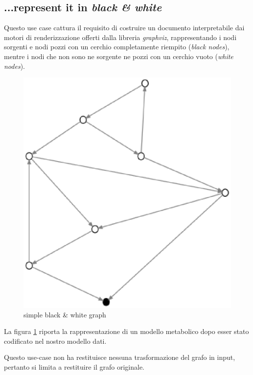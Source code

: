 \subsection{...represent it in \emph{black \& white}}
\label{subsection:represent-it-in-black-and-white}
Questo use case cattura il requisito di costruire un documento
interpretabile dai motori di renderizzazione offerti dalla libreria
\emph{graphviz}, rappresentando i nodi sorgenti e nodi pozzi con un
cerchio completamente riempito (\emph{black nodes}), mentre i nodi che
non sono ne sorgente ne pozzi con un cerchio vuoto (\emph{white
  nodes}).
\begin{figure}
  \centering
  \includegraphics[scale=0.8]{images/applicationOfPrinterPipeFilterOnTarjanModel-phase-PrinterPipeFilter-level-0.eps}
  \caption{simple black \& white graph}
  \label{fig:simple-black-and-white}
\end{figure}

La figura \ref{fig:simple-black-and-white} riporta la rappresentazione
di un modello metabolico dopo esser stato codificato nel nostro
modello dati.

Questo use-case non ha restituisce nessuna trasformazione del grafo in
input, pertanto si limita a restituire il grafo originale.


